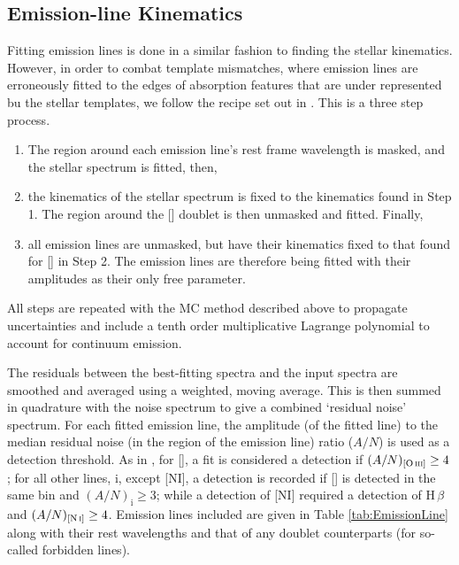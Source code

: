 	\subsection{Emission-line Kinematics}
		\label{subsec:EmissionFit}
		Fitting emission lines is done in a similar fashion to finding the stellar kinematics. However, in order to combat template mismatches, where emission lines are erroneously fitted to the edges of absorption features that are under represented bu the stellar templates, we follow the recipe set out in \citet{Sarzi2005}. This is a three step process.
		\begin{enumerate}
			\item The region around each emission line's rest frame wavelength is masked, and the stellar spectrum is fitted, then,
			\item the kinematics of the stellar spectrum is fixed to the kinematics found in Step 1. The region around the [] doublet is then unmasked and fitted. Finally, 
			\item all emission lines are unmasked, but have their kinematics fixed to that found for [] in Step 2. The emission lines are therefore being fitted with their amplitudes as their only free parameter. 
		\end{enumerate}
		All steps are repeated with the MC method described above to propagate uncertainties and include a tenth order multiplicative Lagrange polynomial to account for continuum emission. 

		The residuals between the best-fitting spectra and the input spectra are smoothed and averaged using a weighted, moving average. This is then summed in quadrature with the noise spectrum to give a combined `residual noise' spectrum. For each fitted emission line, the amplitude (of the fitted line) to the median residual noise (in the region of the emission line) ratio ($A/N$) is used as a detection threshold. As in \citet{Sarzi2005}, for [], a fit is considered a detection if $(A/N)_{[\text{\ion{O}{iii}}]} \ge 4$; for all other lines, i, except [NI], a detection is recorded if [] is detected in the same bin and $(A/N)_\mathrm{i} \ge 3$; while a detection of [NI] required a detection of H\,$\beta$ and $(A/N)_{[\text{\ion{N}{i}}]} \ge 4$. Emission lines included are given in Table \ref{tab:EmissionLine} along with their rest wavelengths and that of any doublet counterparts (for so-called forbidden lines). 

